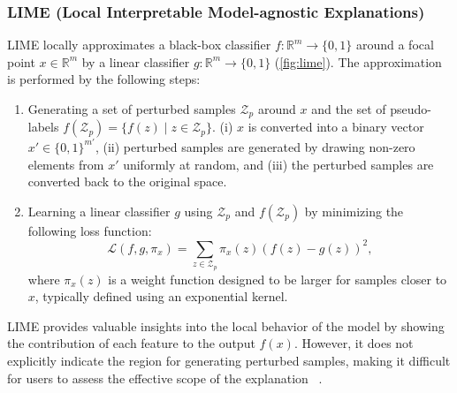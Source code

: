 \documentclass[runningheads]{llncs}
\begin{document}
{\subsubsection[LIME]{%
  LIME (Local Interpretable Model-agnostic Explanations)~\cite{ribeiro2016why}
}
LIME locally
approximates a black-box classifier $f: \mathbb{R}^m \to \{0,1\}$
around a focal point $x \in \mathbb{R}^m$
by a linear classifier $g: \mathbb{R}^m \to \{0,1\}$
(\cref{fig:lime}).
The approximation is performed by the following steps:
\begin{enumerate}
  \item Generating a set of perturbed samples $\mathcal{Z}_p$ around $x$
        and the set of pseudo-labels $f(\mathcal{Z}_p) = \{f(z) \mid z \in \mathcal{Z}_p\}$.
        (i) $x$ is converted into a binary vector
        $x'\in{\{0,1\}}^{m'}$,
        (ii) perturbed samples are generated by drawing non-zero elements
        from $x'$ uniformly at random,
        and (iii) the perturbed samples are converted back to the original space.
  \item Learning a linear classifier $g$
        using $\mathcal{Z}_p$ and $f(\mathcal{Z}_p)$
        by minimizing the following loss function:
        \begin{equation}
          \mathcal{L}(f,g,\pi_x)=\sum_{z\in\mathcal{Z}_p}
          \pi_x(z){\left(f(z)-g(z)\right)}^2,
        \end{equation}
        where $\pi_x(z)$ is a weight function designed to be larger for samples
        closer to $x$, typically defined using an exponential kernel.
\end{enumerate}
LIME provides valuable insights into the local behavior of the model
by showing the contribution of each feature to the output $f(x)$.
However, it does not explicitly indicate the region for generating perturbed samples,
making it difficult for users to assess the effective scope of the explanation
~\cite{ribeiro2018anchors}.

}
\end{document}
